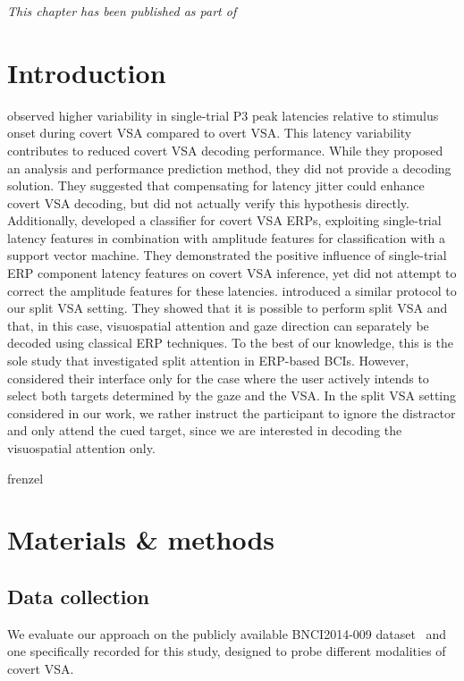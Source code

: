 \emph{This chapter has been published as part of~\textcite{VanDenKerchove2024}}

\section{Introduction}

\textcite{Arico2014} observed higher variability in single-trial P3 peak
latencies relative to stimulus onset during covert VSA compared to overt VSA.
This latency variability contributes to reduced covert VSA decoding performance.
While they proposed an analysis and performance prediction method, they did not provide a
decoding solution.
They suggested that compensating for latency jitter could enhance covert VSA
decoding, but did not actually verify this hypothesis directly.
Additionally, \cite{Hardiansyah2020} developed a classifier for
covert VSA ERPs, exploiting single-trial latency features in combination with
amplitude features for classification with a support vector machine.
They demonstrated the positive influence of single-trial ERP component latency
features on covert VSA inference, yet did not attempt to correct the amplitude
features for these latencies.
\textcite{Frenzel2011} introduced a similar protocol to our split VSA
setting.
They showed that it is possible to perform split VSA and that, in this
case, visuospatial attention and gaze direction can separately be decoded using
classical ERP techniques.
To the best of our
knowledge, this is the sole study that investigated split attention in ERP-based BCIs.
However, \textcite{Frenzel2011} considered their interface only for the case
where the user actively intends to select both targets determined by the gaze
and the VSA.
In the split VSA setting considered in our work, we rather instruct the participant to ignore
the distractor and only attend the cued target, since we are interested in
decoding the visuospatial attention only.

frenzel

\section{Materials \& methods}

\subsection{Data collection}
We evaluate our approach on the
publicly available BNCI2014-009 dataset~\cite{Aloise2012a} and one specifically recorded for this study, designed to
probe different modalities of covert VSA.

